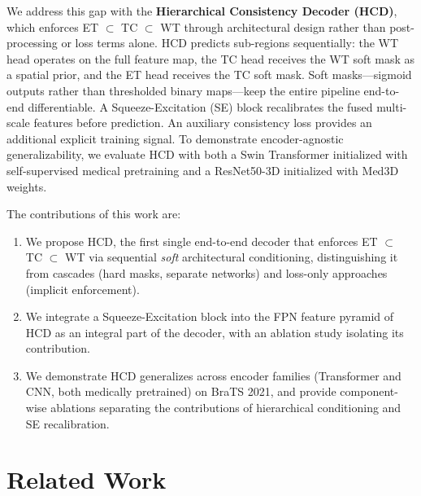 \documentclass[conference]{IEEEtran}
\begin{document}
We address this gap with the \textbf{Hierarchical Consistency Decoder
(HCD)}, which enforces ET $\subset$ TC $\subset$ WT through
architectural design rather than post-processing or loss terms alone.
HCD predicts sub-regions sequentially: the WT head operates on the full
feature map, the TC head receives the WT soft mask as a spatial prior,
and the ET head receives the TC soft mask. Soft masks---sigmoid
outputs rather than thresholded binary maps---keep the entire pipeline
end-to-end differentiable. A Squeeze-Excitation (SE) block
\cite{se_net} recalibrates the fused multi-scale features before
prediction. An auxiliary consistency loss provides an additional
explicit training signal. To demonstrate encoder-agnostic
generalizability, we evaluate HCD with both a Swin Transformer
\cite{liu_swin} initialized with self-supervised medical pretraining
\cite{tang_pretrain} and a ResNet50-3D \cite{he_resnet} initialized
with Med3D \cite{med3d} weights.

The contributions of this work are:
\begin{enumerate}
\item We propose HCD, the first single end-to-end decoder that enforces
ET $\subset$ TC $\subset$ WT via sequential \textit{soft} architectural
conditioning, distinguishing it from cascades (hard masks, separate
networks) and loss-only approaches (implicit enforcement).
\item We integrate a Squeeze-Excitation block \cite{se_net} into the
FPN feature pyramid of HCD as an integral part of the decoder, with an
ablation study isolating its contribution.
\item We demonstrate HCD generalizes across encoder families
(Transformer and CNN, both medically pretrained) on BraTS 2021, and
provide component-wise ablations separating the contributions of
hierarchical conditioning and SE recalibration.
\end{enumerate}

\section{Related Work}
\end{document}
